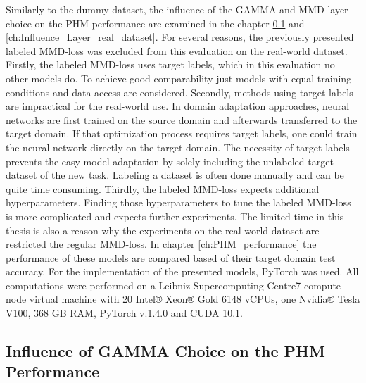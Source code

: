 Similarly to the dummy dataset, the influence of the GAMMA and MMD layer choice on the PHM performance are examined in the chapter \ref{ch:Influence_GAMMA_real_dataset} and \ref{ch:Influence_Layer_real_dataset}. For several reasons, the previously presented labeled MMD-loss was excluded from this evaluation on the real-world dataset. Firstly, the labeled MMD-loss uses target labels, which in this evaluation no other models do. To achieve good comparability just models with equal training conditions and data access are considered. Secondly, methods using target labels are impractical for the real-world use. In domain adaptation approaches, neural networks are first trained on the source domain and afterwards transferred to the target domain. If that optimization process requires target labels, one could train the neural network directly on the target domain. The necessity of target labels prevents the easy model adaptation by solely including the unlabeled target dataset of the new task. Labeling a dataset is often done manually and can be quite time consuming. Thirdly, the labeled MMD-loss expects additional hyperparameters. Finding those hyperparameters to tune the labeled MMD-loss is more complicated and expects further experiments. The limited time in this thesis is also a reason why the experiments on the real-world dataset are restricted the regular MMD-loss. In chapter \ref{ch:PHM_performance} the performance of these models are compared based of their target domain test accuracy. For the implementation of the presented models, PyTorch was used. All computations were performed on a Leibniz Supercomputing Centre7 compute node virtual machine with 20
Intel® Xeon® Gold 6148 vCPUs, one Nvidia® Tesla V100, 368 GB RAM, PyTorch v.1.4.0 and CUDA 10.1.


\subsection{Influence of GAMMA Choice on the PHM Performance}\label{ch:Influence_GAMMA_real_dataset}

